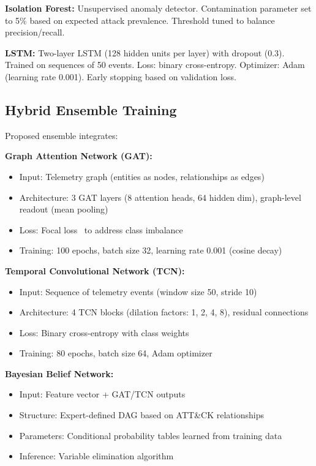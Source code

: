 \textbf{Isolation Forest:} Unsupervised anomaly detector. Contamination parameter set to 5\% based on expected attack prevalence. Threshold tuned to balance precision/recall.

\textbf{LSTM:} Two-layer LSTM (128 hidden units per layer) with dropout (0.3). Trained on sequences of 50 events. Loss: binary cross-entropy. Optimizer: Adam (learning rate 0.001). Early stopping based on validation loss.

\subsection{Hybrid Ensemble Training}
Proposed ensemble integrates:

\textbf{Graph Attention Network (GAT):}
\begin{itemize}
    \item Input: Telemetry graph (entities as nodes, relationships as edges)
    \item Architecture: 3 GAT layers (8 attention heads, 64 hidden dim), graph-level readout (mean pooling)
    \item Loss: Focal loss~\cite{lin2017focal} to address class imbalance
    \item Training: 100 epochs, batch size 32, learning rate 0.001 (cosine decay)
\end{itemize}

\textbf{Temporal Convolutional Network (TCN):}
\begin{itemize}
    \item Input: Sequence of telemetry events (window size 50, stride 10)
    \item Architecture: 4 TCN blocks (dilation factors: 1, 2, 4, 8), residual connections
    \item Loss: Binary cross-entropy with class weights
    \item Training: 80 epochs, batch size 64, Adam optimizer
\end{itemize}

\textbf{Bayesian Belief Network:}
\begin{itemize}
    \item Input: Feature vector + GAT/TCN outputs
    \item Structure: Expert-defined DAG based on ATT\&CK relationships
    \item Parameters: Conditional probability tables learned from training data
    \item Inference: Variable elimination algorithm
\end{itemize}

